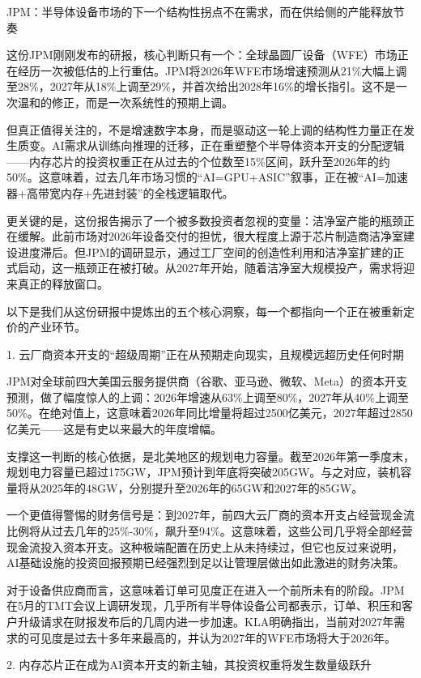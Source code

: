 \documentclass[11pt]{ctexart}
\begin{document}
JPM：半导体设备市场的下一个结构性拐点不在需求，而在供给侧的产能释放节奏

这份JPM刚刚发布的研报，核心判断只有一个：全球晶圆厂设备（WFE）市场正在经历一次被低估的上行重估。JPM将2026年WFE市场增速预测从21\%大幅上调至28\%，2027年从18\%上调至29\%，并首次给出2028年16\%的增长指引。这不是一次温和的修正，而是一次系统性的预期上调。

但真正值得关注的，不是增速数字本身，而是驱动这一轮上调的结构性力量正在发生质变。AI需求从训练向推理的迁移，正在重塑整个半导体资本开支的分配逻辑——内存芯片的投资权重正在从过去的个位数至15\%区间，跃升至2026年的约50\%。这意味着，过去几年市场习惯的“AI=GPU+ASIC”叙事，正在被“AI=加速器+高带宽内存+先进封装”的全栈逻辑取代。

更关键的是，这份报告揭示了一个被多数投资者忽视的变量：洁净室产能的瓶颈正在缓解。此前市场对2026年设备交付的担忧，很大程度上源于芯片制造商洁净室建设进度滞后。但JPM的调研显示，通过工厂空间的创造性利用和洁净室扩建的正式启动，这一瓶颈正在被打破。从2027年开始，随着洁净室大规模投产，需求将迎来真正的释放窗口。

以下是我们从这份研报中提炼出的五个核心洞察，每一个都指向一个正在被重新定价的产业环节。

1. 云厂商资本开支的“超级周期”正在从预期走向现实，且规模远超历史任何时期

JPM对全球前四大美国云服务提供商（谷歌、亚马逊、微软、Meta）的资本开支预测，做了幅度惊人的上调：2026年增速从63\%上调至80\%，2027年从40\%上调至50\%。在绝对值上，这意味着2026年同比增量将超过2500亿美元，2027年超过2850亿美元——这是有史以来最大的年度增幅。

支撑这一判断的核心依据，是北美地区的规划电力容量。截至2026年第一季度末，规划电力容量已超过175GW，JPM预计到年底将突破205GW。与之对应，装机容量将从2025年的48GW，分别提升至2026年的65GW和2027年的85GW。

一个更值得警惕的财务信号是：到2027年，前四大云厂商的资本开支占经营现金流比例将从过去几年的25\%-30\%，飙升至94\%。这意味着，这些公司几乎将全部经营现金流投入资本开支。这种极端配置在历史上从未持续过，但它也反过来说明，AI基础设施的投资回报预期已经强烈到足以让管理层做出如此激进的财务决策。

对于设备供应商而言，这意味着订单可见度正在进入一个前所未有的阶段。JPM在5月的TMT会议上调研发现，几乎所有半导体设备公司都表示，订单、积压和客户升级请求在财报发布后的几周内进一步加速。KLA明确指出，当前对2027年需求的可见度是过去十多年来最高的，并认为2027年的WFE市场将大于2026年。

2. 内存芯片正在成为AI资本开支的新主轴，其投资权重将发生数量级跃升
\end{document}
